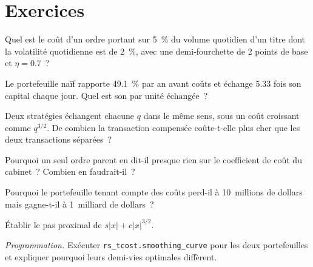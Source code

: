 \section{Exercices}

\begin{exercise}[$\star$]\label{exo:rs:transaction-costs-in-research:1}
Quel est le coût d'un ordre portant sur 5~\% du volume quotidien d'un titre dont la volatilité quotidienne est de 2~\%, avec une demi-fourchette de 2 points de base et $\eta = 0.7$~?
\end{exercise}

\begin{exercise}[$\star$]\label{exo:rs:transaction-costs-in-research:2}
Le portefeuille naïf rapporte 49.1~\% par an avant coûts et échange 5.33 fois son capital chaque jour. Quel est son  par unité échangée~?
\end{exercise}

\begin{exercise}[$\star$]\label{exo:rs:transaction-costs-in-research:3}
Deux stratégies échangent chacune $q$ dans le même sens, sous un coût croissant comme $q^{3/2}$. De combien la transaction compensée coûte-t-elle plus cher que les deux transactions séparées~?
\end{exercise}

\begin{exercise}[$\star\star$]\label{exo:rs:transaction-costs-in-research:4}
Pourquoi un seul ordre parent en dit-il presque rien sur le coefficient de coût du cabinet~? Combien en faudrait-il~?
\end{exercise}

\begin{exercise}[$\star\star$]\label{exo:rs:transaction-costs-in-research:5}
Pourquoi le portefeuille tenant compte des coûts perd-il à 10~millions de dollars mais gagne-t-il à 1~milliard de dollars~?
\end{exercise}

\begin{exercise}[$\star\star$]\label{exo:rs:transaction-costs-in-research:6}
Établir le pas proximal de $s\lvert x\rvert + c\lvert x\rvert^{3/2}$.
\end{exercise}

\begin{exercise}[$\star\star\star$]\label{exo:rs:transaction-costs-in-research:7}
\emph{Programmation.} Exécuter \texttt{rs\_tcost.smoothing\_curve} pour les deux portefeuilles et expliquer pourquoi leurs demi-vies optimales diffèrent.
\end{exercise}

